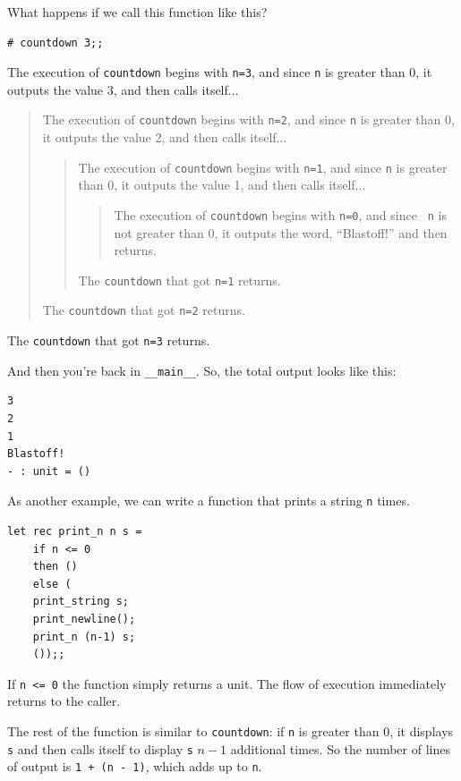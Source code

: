 \documentclass[10pt]{book}
\begin{document}
What happens if we call this function like this?

\beforeverb
\begin{verbatim}
# countdown 3;;
\end{verbatim}
\afterverb
%
The execution of {\tt countdown} begins with {\tt n=3}, and since
{\tt n} is greater than 0, it outputs the value 3, and then calls itself...

\begin{quote}
The execution of {\tt countdown} begins with {\tt n=2}, and since
{\tt n} is greater than 0, it outputs the value 2, and then calls itself...

\begin{quote}
The execution of {\tt countdown} begins with {\tt n=1}, and since
{\tt n} is greater than 0, it outputs the value 1, and then calls itself...

\begin{quote}
The execution of {\tt countdown} begins with {\tt n=0}, and since {\tt
n} is not greater than 0, it outputs the word, ``Blastoff!'' and then
returns.
\end{quote}

The {\tt countdown} that got {\tt n=1} returns.
\end{quote}

The {\tt countdown} that got {\tt n=2} returns.
\end{quote}

The {\tt countdown} that got {\tt n=3} returns.

And then you're back in \verb"__main__".  So, the
total output looks like this:

\beforeverb
\begin{verbatim}
3
2
1
Blastoff!
- : unit = ()
\end{verbatim}
\afterverb
%

As another example, we can write a function that prints a
string {\tt n} times.

\beforeverb
\begin{verbatim}
let rec print_n n s = 
    if n <= 0
    then ()
    else (
	print_string s;
	print_newline();
	print_n (n-1) s;
	());;
\end{verbatim}
\afterverb
%
If {\tt n <= 0} the function simply returns a unit. The
flow of execution immediately returns to the caller.

The rest of the function is similar to {\tt countdown}: if {\tt n} is
greater than 0, it displays {\tt s} and then calls itself to display
{\tt s} $n-1$ additional times.  So the number of lines of output
is {\tt 1 + (n - 1)}, which adds up to {\tt n}.
\end{document}
